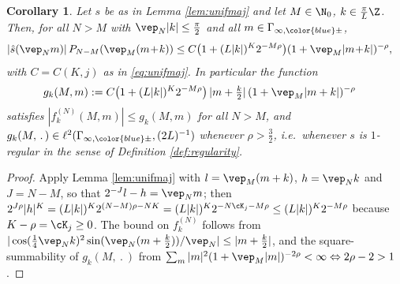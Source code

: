 \documentclass[a4paper, 11pt]{article}
\newcommand{\ltwo}{\ell^{2}}
\DeclareMathOperator{\1}{\mathds{1}}
\newtheorem{cor}[thm]{Corollary}
\begin{document}
\begin{cor}
\label{cor:unifmaj}
Let $s$ be as in Lemma \ref{lem:unifmaj} and let $M\in\N_{0}$, $k\in\tfrac{\pi}{L}\Z$. Then, for all $N>M$ with $\vep_{N}|k|\leq\tfrac{\pi}{2}$ and all $m\in\Gamma_{\infty,{\color{blue}\pm}}$,
\begin{align}
\label{eq:unifmajf}
|\hat{s}(\vep_{N}m)|\!\ P_{N-M}(\vep_{M}(m\!+\!k)) & \leq C\big(1+(L|k|)^{K}2^{-M\rho}\big)(1+\vep_{M}|m\!+\!k|)^{-\rho},
\end{align}
with $C=C(K,j)$ as in \eqref{eq:unifmaj}. In particular the function
\begin{align}
\label{eq:majorant}
g_{k}(M,m) & := C\big(1+(L|k|)^{K}2^{-M\rho}\big)\!\ |m+\tfrac{k}{2}|\!\ (1+\vep_{M}|m+k|)^{-\rho}
\end{align}
satisfies $|f^{(N)}_{k}(M,m)|\leq g_{k}(M,m)$ for all $N>M$, and $g_{k}(M,\!\ .\!\ )\in\ltwo(\Gamma_{\infty,{\color{blue}\pm}},(2L)^{-1})$ whenever $\rho>\tfrac{3}{2}$, i.e.~whenever $s$ is $1$-regular in the sense of Definition \ref{def:regularity}.
\end{cor}
\begin{proof}
Apply Lemma \ref{lem:unifmaj} with $l=\vep_{M}(m+k)$, $h=\vep_{N}k$ and $J=N-M$, so that $2^{-J}l-h=\vep_{N}m$; then $2^{J\rho}|h|^{K}=(L|k|)^{K}2^{(N-M)\rho-NK}=(L|k|)^{K}2^{-N\cK_{j}-M\rho}\leq(L|k|)^{K}2^{-M\rho}$ because $K-\rho=\cK_{j}\geq0$. The bound on $f^{(N)}_{k}$ follows from $|\cos(\tfrac{1}{4}\vep_{N}k)^{2}\sin(\vep_{N}(m+\tfrac{k}{2}))/\vep_{N}|\leq|m+\tfrac{k}{2}|$, and the square-summability of $g_{k}(M,\!\ .\!\ )$ from $\sum_{m}|m|^{2}(1+\vep_{M}|m|)^{-2\rho}<\infty\Leftrightarrow2\rho-2>1$.
\end{proof}
\end{document}
